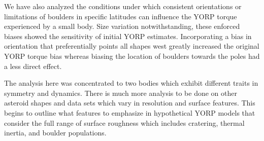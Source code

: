 We have also analyzed the conditions under which consistent orientations or limitations of boulders in specific latitudes can influence the YORP torque experienced by a small body. Size variation notwithstanding, these enforced biases showed the sensitivity of initial YORP estimates. Incorporating a bias in orientation that preferentially points all shapes west greatly increased the original YORP torque bias whereas biasing the location of boulders towards the poles had a less direct effect.  

The analysis here was concentrated to two bodies which exhibit different traits in symmetry and dynamics. There is much more analysis to be done on other asteroid shapes and data sets which vary in resolution and surface features. This begins to outline what features to emphasize in hypothetical YORP models that consider the full range of surface roughness which includes cratering, thermal inertia, and boulder populations. 

